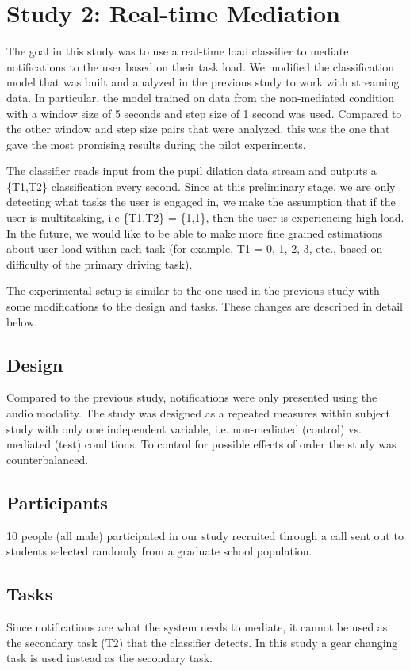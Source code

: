 \section{Study 2: Real-time Mediation}
The goal in this study was to use a real-time load classifier to mediate notifications to the user based on their task load. We modified the classification model that was built and analyzed in the previous study to work with streaming data. In particular, the model trained on data from the non-mediated condition with a window size of 5 seconds and step size of 1 second was used. Compared to the other window and step size pairs that were analyzed, this was the one that gave the most promising results during the pilot experiments.

The classifier reads input from the pupil dilation data stream and outputs a \{T1,T2\} classification every second. Since at this preliminary stage, we are only detecting what tasks the user is engaged in, we make the assumption that if the user is multitasking, i.e \{T1,T2\} = \{1,1\}, then the user is experiencing high load. In the future, we would like to be able to make more fine grained estimations about user load within each task (for example, T1 = 0, 1, 2, 3, etc., based on difficulty of the primary driving task).   

The experimental setup is similar to the one used in the previous study with some modifications to the design and tasks. These changes are described in detail below.

\subsection{Design}
Compared to the previous study, notifications were only presented using the audio modality. The study was designed as a repeated measures within subject study with only one independent variable, i.e. non-mediated (control) vs. mediated (test) conditions. To control for possible effects of order the study was counterbalanced. 

\subsection{Participants}
10 people (all male) participated in our study recruited through a call sent out to students selected randomly from a graduate school population.

\subsection{Tasks}
Since notifications are what the system needs to mediate, it cannot be used as the secondary task (T2) that the classifier detects. In this study a gear changing task is used instead as the secondary task. 
 

